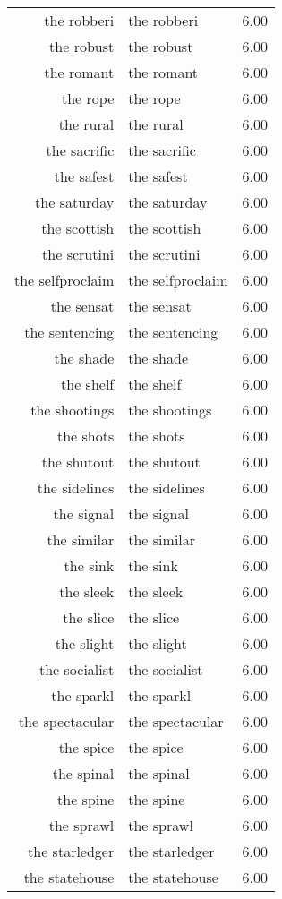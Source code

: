 \begin{table}[ht]
\begin{tabular}{rlr}
  the robberi & the robberi & 6.00 \\ 
  the robust & the robust & 6.00 \\ 
  the romant & the romant & 6.00 \\ 
  the rope & the rope & 6.00 \\ 
  the rural & the rural & 6.00 \\ 
  the sacrific & the sacrific & 6.00 \\ 
  the safest & the safest & 6.00 \\ 
  the saturday & the saturday & 6.00 \\ 
  the scottish & the scottish & 6.00 \\ 
  the scrutini & the scrutini & 6.00 \\ 
  the selfproclaim & the selfproclaim & 6.00 \\ 
  the sensat & the sensat & 6.00 \\ 
  the sentencing & the sentencing & 6.00 \\ 
  the shade & the shade & 6.00 \\ 
  the shelf & the shelf & 6.00 \\ 
  the shootings & the shootings & 6.00 \\ 
  the shots & the shots & 6.00 \\ 
  the shutout & the shutout & 6.00 \\ 
  the sidelines & the sidelines & 6.00 \\ 
  the signal & the signal & 6.00 \\ 
  the similar & the similar & 6.00 \\ 
  the sink & the sink & 6.00 \\ 
  the sleek & the sleek & 6.00 \\ 
  the slice & the slice & 6.00 \\ 
  the slight & the slight & 6.00 \\ 
  the socialist & the socialist & 6.00 \\ 
  the sparkl & the sparkl & 6.00 \\ 
  the spectacular & the spectacular & 6.00 \\ 
  the spice & the spice & 6.00 \\ 
  the spinal & the spinal & 6.00 \\ 
  the spine & the spine & 6.00 \\ 
  the sprawl & the sprawl & 6.00 \\ 
  the starledger & the starledger & 6.00 \\ 
  the statehouse & the statehouse & 6.00 \\ 

\end{tabular}
\end{table}

